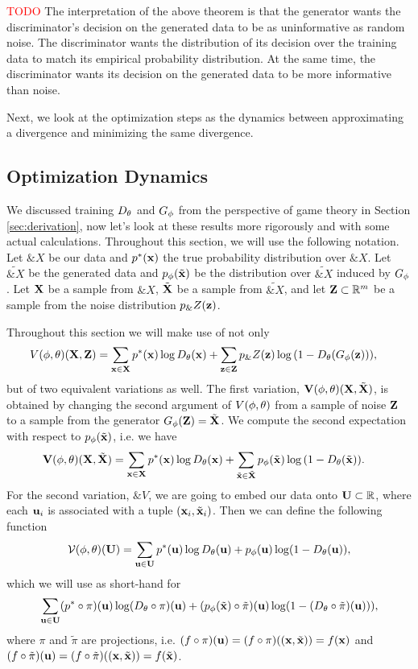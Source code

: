 \textcolor{red}{TODO} The interpretation of the above theorem is that
the generator wants the discriminator's decision on the generated data
to be as uninformative as random noise.  The discriminator wants the
distribution of its decision over the training data to match its
empirical probability distribution. At the same time, the
discriminator wants its decision on the generated data to be more
informative than noise.

Next, we look at the optimization steps as the dynamics between
approximating a divergence and minimizing the same divergence.

\subsection{Optimization Dynamics}
\label{sec:optimization-dynamics}

We discussed training $D_\theta$ and $G_\phi$ from the perspective of game
theory in Section \ref{sec:derivation}, now let's look at these
results more rigorously and with some actual calculations. Throughout
this section, we will use the following notation. Let $\&X$ be our
data and $p^*(\mathbf{x})$ the true probability distribution over $\&X$. Let
$\tilde{\&X}$ be the generated data and $p_{\phi}(\tilde{\mathbf{x}})$ be the distribution over
$\tilde{\&X}$ induced by $G_\phi$. Let $\mathbf{X}$ be a sample from $\&X$,
$\tilde{\mathbf{X}}$ be a sample from $\tilde{\&X}$, and let
$\mathbf{Z} \subset \mathbb{R}^m$ be a sample from the noise distribution $p_\&Z(\mathbf{z})$.

Throughout this section we will make use of not only
\begin{align} V(\phi, \theta)(\mathbf{X}, \mathbf{Z}) & = \sum_{\mathbf{x} \in \mathbf{X}}p^*(\mathbf{x})\log{D_\theta(\mathbf{x})} +
  \sum_{\mathbf{z} \in \mathbf{Z}}p_\&Z(\mathbf{z})\log{(1 - D_\theta(G_\phi(\mathbf{z})))},
\end{align}
but of two equivalent variations as well. The first variation, $\mathbf{V}(\phi,
\theta)(\mathbf{X}, \tilde{\mathbf{X}})$, is obtained by changing the second argument of $V(\phi, \theta)$
from a sample of noise $\mathbf{Z}$ to a sample from the generator $G_\phi(\mathbf{Z}) =
\tilde{\mathbf{X}}$. We compute the second expectation with respect to $p_{\phi}(\tilde{\mathbf{x}})$, i.e. we
have
\begin{align} \mathbf{V}(\phi, \theta)(\mathbf{X}, \tilde{\mathbf{X}}) & = \sum_{\mathbf{x} \in
    \mathbf{X}}p^*(\mathbf{x})\log{D_\theta(\mathbf{x})} + \sum_{\tilde{\mathbf{x}} \in \tilde{\mathbf{X}}}p_{\phi}(\tilde{\mathbf{x}})\log{(1 -
    D_\theta(\tilde{\mathbf{x}}))}.
\end{align}
For the second variation, $\&V$, we are going to embed our data onto $\mathbf{U}
\subset \mathbb{R}$, where each $\mathbf{u}_i$ is associated with a tuple $(\mathbf{x}_i,
\tilde{\mathbf{x}}_i)$. Then we can define the following function
\begin{align}
  \label{eq:joined}
  \mathcal{V}(\phi, \theta)(\mathbf{U}) = \sum_{\mathbf{u} \in \mathbf{U}} p^*(\mathbf{u}) \log D_\theta(\mathbf{u}) + p_{\phi}(\mathbf{u}) \log(1 - D_\theta(\mathbf{u})),
\end{align}
which we will use as short-hand for
\begin{align}
  \label{eq:joined-verbose}
  \sum_{\mathbf{u} \in \mathbf{U}} (p^* \circ \pi)(\mathbf{u})\log (D_\theta \circ \pi)(\mathbf{u}) + (p_{\phi}(\tilde{\mathbf{x}}) \circ \tilde{\pi})(\mathbf{u}) \log(1 - (D_\theta \circ \tilde{\pi})(\mathbf{u}))),
\end{align}
where $\pi$ and $\tilde{\pi}$ are projections, i.e. $(f \circ \pi)(\mathbf{u}) = (f
\circ \pi)((\mathbf{x}, \tilde{\mathbf{x}})) = f(\mathbf{x})$ and $(f \circ \tilde{\pi})(\mathbf{u}) = (f
\circ \tilde{\pi})((\mathbf{x}, \tilde{\mathbf{x}})) = f(\tilde{\mathbf{x}})$.

